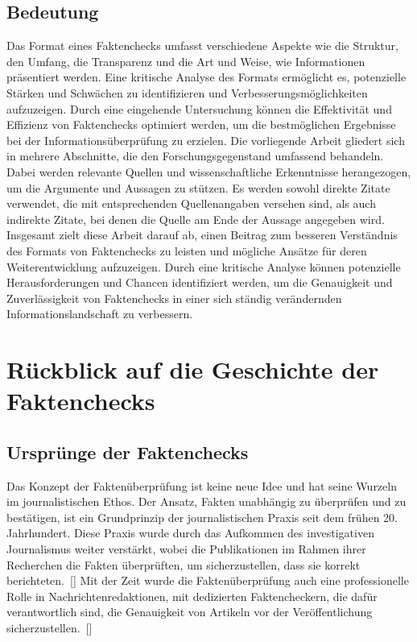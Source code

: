 \documentclass[a4paper,listof=totoc,bibliography=totoc]{scrartcl}
\begin{document}
\subsection{Bedeutung} 
Das Format eines Faktenchecks umfasst verschiedene Aspekte wie die Struktur, den 
Umfang, die Transparenz und die Art und Weise, wie Informationen präsentiert werden. 
Eine kritische Analyse des Formats ermöglicht es, potenzielle Stärken und Schwächen 
zu identifizieren und Verbesserungsmöglichkeiten aufzuzeigen. Durch eine eingehende 
Untersuchung können die Effektivität und Effizienz von Faktenchecks optimiert werden, 
um die bestmöglichen Ergebnisse bei der Informationsüberprüfung zu erzielen.
Die vorliegende Arbeit gliedert sich in mehrere Abschnitte, die den Forschungsgegenstand 
umfassend behandeln. Dabei werden relevante Quellen und wissenschaftliche Erkenntnisse 
herangezogen, um die Argumente und Aussagen zu stützen. Es werden sowohl direkte Zitate 
verwendet, die mit entsprechenden Quellenangaben versehen sind, als auch indirekte Zitate, 
bei denen die Quelle am Ende der Aussage angegeben wird.
Insgesamt zielt diese Arbeit darauf ab, einen Beitrag zum besseren Verständnis des Formats 
von Faktenchecks zu leisten und mögliche Ansätze für deren Weiterentwicklung aufzuzeigen. 
Durch eine kritische Analyse können potenzielle Herausforderungen und Chancen identifiziert 
werden, um die Genauigkeit und Zuverlässigkeit von Faktenchecks in einer sich ständig 
verändernden Informationslandschaft zu verbessern.

\section{Rückblick auf die Geschichte der Faktenchecks}

\subsection{Ursprünge der Faktenchecks}

Das Konzept der Faktenüberprüfung ist keine neue Idee und hat seine Wurzeln im journalistischen Ethos.
Der Ansatz, Fakten unabhängig zu überprüfen und zu bestätigen, ist ein Grundprinzip der journalistischen 
Praxis seit dem frühen 20. Jahrhundert. Diese Praxis wurde durch das Aufkommen des investigativen 
Journalismus weiter verstärkt, wobei die Publikationen im Rahmen ihrer Recherchen die Fakten 
überprüften, um sicherzustellen, dass sie korrekt berichteten.~[\cite{graves2018}] Mit der Zeit 
wurde die Faktenüberprüfung auch eine professionelle Rolle in Nachrichtenredaktionen, mit dedizierten 
Faktencheckern, die dafür verantwortlich sind, die Genauigkeit von Artikeln vor der Veröffentlichung 
sicherzustellen.~[\cite{silverman2009}]
\end{document}
